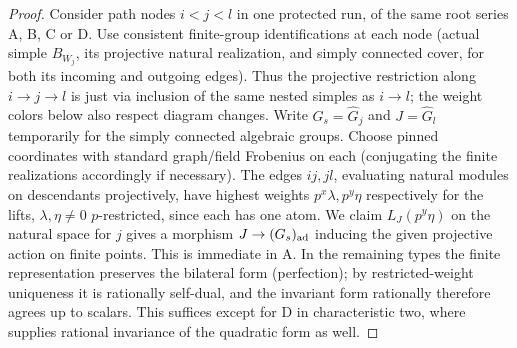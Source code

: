 \begin{proof}
Consider path nodes \(i<j<l\) in one protected run, of the same root series A, B, C or D. Use consistent finite-group identifications at each node (actual simple \(B_{W_j}\), its projective natural realization, and simply connected cover, for both its incoming and outgoing edges). Thus the projective restriction along \(i\to j\to l\) is just via inclusion of the same nested simples as \(i\to l\); the weight colors below also respect diagram changes. Write \(G_s=\widehat G_j\) and \(J=\widehat G_l\) temporarily for the simply connected algebraic groups. Choose pinned coordinates with standard graph/field Frobenius on each (conjugating the finite realizations accordingly if necessary). The edges \(ij,jl\), evaluating natural modules on descendants projectively, have highest weights \(p^x\lambda,p^y\eta\) respectively for the lifts, \(\lambda,\eta\ne0\) \(p\)-restricted, since each has one atom. We claim \(L_J(p^y\eta)\) on the natural space for \(j\) gives a morphism \(J\to (G_s)_{\rm ad}\) inducing the given projective action on finite points. This is immediate in A. In the remaining types the finite representation preserves the bilateral form (perfection); by restricted-weight uniqueness it is rationally self-dual, and the invariant form rationally therefore agrees up to scalars. This suffices except for D in characteristic two, where  supplies rational invariance of the quadratic form as well.


\end{proof}
